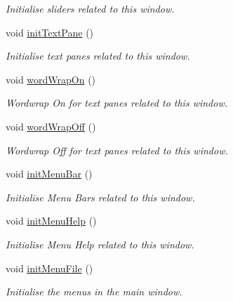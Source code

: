 \begin{DoxyCompactItemize}
\begin{DoxyCompactList}\small\item\em Initialise sliders related to this window. \end{DoxyCompactList}\item 
void \hyperlink{classcom_1_1lclion_1_1midigui_1_1_j_frame_m_i_d_i_piano_sheet_creator_af5b3b9751934a25e7d0b73cf458cea99}{init\+Text\+Pane} ()
\begin{DoxyCompactList}\small\item\em Initialise text panes related to this window. \end{DoxyCompactList}\item 
void \hyperlink{classcom_1_1lclion_1_1midigui_1_1_j_frame_m_i_d_i_piano_sheet_creator_ab462219e37674c0df3744f7de1c980ca}{word\+Wrap\+On} ()
\begin{DoxyCompactList}\small\item\em Wordwrap On for text panes related to this window. \end{DoxyCompactList}\item 
void \hyperlink{classcom_1_1lclion_1_1midigui_1_1_j_frame_m_i_d_i_piano_sheet_creator_a42f3eed8a1306302bdebd9dea75883c5}{word\+Wrap\+Off} ()
\begin{DoxyCompactList}\small\item\em Wordwrap Off for text panes related to this window. \end{DoxyCompactList}\item 
void \hyperlink{classcom_1_1lclion_1_1midigui_1_1_j_frame_m_i_d_i_piano_sheet_creator_a0b0e9cd41d19d9cb52443c381a519994}{init\+Menu\+Bar} ()
\begin{DoxyCompactList}\small\item\em Initialise Menu Bars related to this window. \end{DoxyCompactList}\item 
void \hyperlink{classcom_1_1lclion_1_1midigui_1_1_j_frame_m_i_d_i_piano_sheet_creator_a098b454223f052d378bd20af06f6ddf0}{init\+Menu\+Help} ()
\begin{DoxyCompactList}\small\item\em Initialise Menu Help related to this window. \end{DoxyCompactList}\item 
void \hyperlink{classcom_1_1lclion_1_1midigui_1_1_j_frame_m_i_d_i_piano_sheet_creator_a48db1e242ba2acdb007ab6e8f5c245c6}{init\+Menu\+File} ()
\begin{DoxyCompactList}\small\item\em Initialise the menus in the main window. \end{DoxyCompactList}\item 

\end{DoxyCompactItemize}
